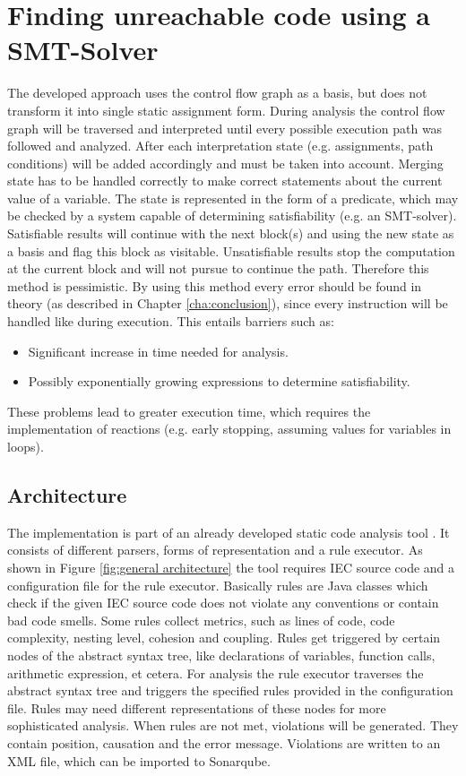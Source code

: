 
\chapter{Finding unreachable code using a SMT-Solver}
\label{cha:finding unreachable code using a smt-solver}

The developed approach uses the control flow graph as a basis, but does not transform it into single static assignment form.
During analysis the control flow graph will be traversed and interpreted until every possible execution path was followed and analyzed.
After each interpretation state (e.g. assignments, path conditions) will be added accordingly and must be taken into account.
Merging state has to be handled correctly to make correct statements about the current value of a variable.
The state is represented in the form of a predicate, which may be checked by a system capable of determining satisfiability (e.g. an SMT-solver).
Satisfiable results will continue with the next block(s) and using the new state as a basis and flag this block as visitable.
Unsatisfiable results stop the computation at the current block and will not pursue to continue the path.
Therefore this method is pessimistic.
By using this method every error should be found in theory (as described in Chapter \ref{cha:conclusion}), since every instruction will be handled like during execution. 
This entails barriers such as: 
\begin{itemize}
	\item Significant increase in time needed for analysis. 
	\item Possibly exponentially growing expressions to determine satisfiability.
\end{itemize}
These problems lead to greater execution time, which requires the implementation of reactions (e.g. early stopping, assuming values for variables in loops).

\section{Architecture}
The implementation is part of an already developed static code analysis tool \cite{Prahofer_2012}. 
It consists of different parsers, forms of representation and a rule executor. 
As shown in Figure \ref{fig:general architecture} the tool requires IEC source code and a configuration file for the rule executor.
Basically rules are Java classes which check if the given IEC source code does not violate any conventions or contain bad code smells. 
Some rules collect metrics, such as lines of code, code complexity, nesting level, cohesion and coupling.
Rules get triggered by certain nodes of the abstract syntax tree, like declarations of variables, function calls, arithmetic expression, et cetera.
For analysis the rule executor traverses the abstract syntax tree and triggers the specified rules provided in the configuration file.
Rules may need different representations of these nodes for more sophisticated analysis. 
When rules are not met, violations will be generated. They contain position, causation and the error message. Violations are written to an XML file, which can be imported to Sonarqube\cite{sonarqube}.


